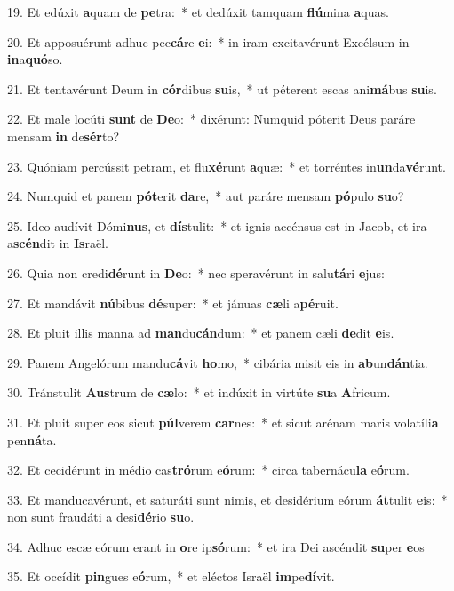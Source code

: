 19. Et edúxit \textbf{a}quam de \textbf{pe}tra:~*  et dedúxit tamquam \textbf{flú}mina \textbf{a}quas.\

20. Et apposuérunt adhuc pec\textbf{cá}re \textbf{e}i:~*  in iram excitavérunt Excélsum in \textbf{in}a\textbf{quó}so.\

21. Et tentavérunt Deum in \textbf{cór}dibus \textbf{su}is,~*  ut péterent escas ani\textbf{má}bus \textbf{su}is.\

22. Et male locúti \textbf{sunt} de \textbf{De}o:~*  dixérunt: Numquid póterit Deus paráre mensam \textbf{in} de\textbf{sér}to?\

23. Quóniam percússit petram, et flu\textbf{xé}runt \textbf{a}quæ:~*  et torréntes in\textbf{un}da\textbf{vé}runt.\

24. Numquid et panem \textbf{pót}erit \textbf{da}re,~*  aut paráre mensam \textbf{pó}pulo \textbf{su}o?\

25. Ideo audívit Dómi\textbf{nus}, et \textbf{dís}tulit:~*  et ignis accénsus est in Jacob, et ira a\textbf{scén}dit in \textbf{Is}raël.\

26. Quia non credi\textbf{dé}runt in \textbf{De}o:~*  nec speravérunt in salu\textbf{tá}ri \textbf{e}jus:\

27. Et mandávit \textbf{nú}bibus \textbf{dé}super:~*  et jánuas \textbf{cæ}li a\textbf{pé}ruit.\

28. Et pluit illis manna ad \textbf{man}du\textbf{cán}dum:~*  et panem cæli \textbf{de}dit \textbf{e}is.\

29. Panem Angelórum mandu\textbf{cá}vit \textbf{ho}mo,~*  cibária misit eis in \textbf{ab}un\textbf{dán}tia.\

30. Tránstulit \textbf{Aus}trum de \textbf{cæ}lo:~*  et indúxit in virtúte \textbf{su}a \textbf{A}fricum.\

31. Et pluit super eos sicut \textbf{púl}verem \textbf{car}nes:~*  et sicut arénam maris volatíli\textbf{a} pen\textbf{ná}ta.\

32. Et cecidérunt in médio cas\textbf{tró}rum e\textbf{ó}rum:~*  circa tabernácu\textbf{la} e\textbf{ó}rum.\

33. Et manducavérunt, et saturáti sunt nimis, et desidérium eórum \textbf{át}tulit \textbf{e}is:~*  non sunt fraudáti a desi\textbf{dé}rio \textbf{su}o.\

34. Adhuc escæ eórum erant in \textbf{o}re ip\textbf{só}rum:~*  et ira Dei ascéndit \textbf{su}per \textbf{e}os\

35. Et occídit \textbf{pin}gues e\textbf{ó}rum,~*  et eléctos Israël \textbf{im}pe\textbf{dí}vit.\

